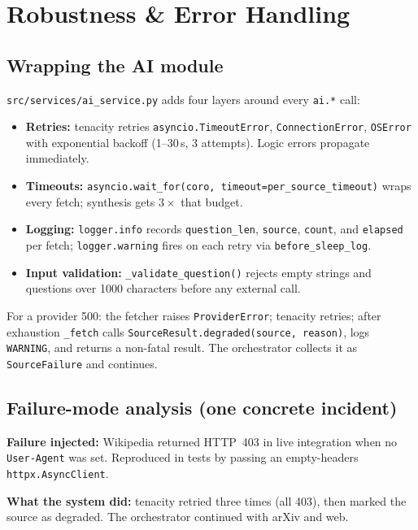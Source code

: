 \documentclass[11pt,a4paper]{article}
\begin{document}
\section{Robustness \& Error Handling}\label{sec:robustness}

\subsection{Wrapping the AI module}

\texttt{src/services/ai\_service.py} adds four layers around every \texttt{ai.*} call:

\begin{itemize}[nosep,leftmargin=1.2em]
  \item \textbf{Retries:} tenacity retries \texttt{asyncio.TimeoutError}, \texttt{ConnectionError}, \texttt{OSError} with exponential backoff (1--30\,s, 3 attempts). Logic errors propagate immediately.
  \item \textbf{Timeouts:} \texttt{asyncio.wait\_for(coro, timeout=per\_source\_timeout)} wraps every fetch; synthesis gets $3\times$ that budget.
  \item \textbf{Logging:} \texttt{logger.info} records \texttt{question\_len}, \texttt{source}, \texttt{count}, and \texttt{elapsed} per fetch; \texttt{logger.warning} fires on each retry via \texttt{before\_sleep\_log}.
  \item \textbf{Input validation:} \texttt{\_validate\_question()} rejects empty strings and questions over 1000 characters before any external call.
\end{itemize}

For a provider 500: the fetcher raises \texttt{ProviderError}; tenacity retries; after exhaustion \texttt{\_fetch} calls \texttt{SourceResult.degraded(source, reason)}, logs \texttt{WARNING}, and returns a non-fatal result. The orchestrator collects it as \texttt{SourceFailure} and continues.

\subsection{Failure-mode analysis (one concrete incident)}

\textbf{Failure injected:} Wikipedia returned HTTP~403 in live integration when no \texttt{User-Agent} was set. Reproduced in tests by passing an empty-headers \texttt{httpx.AsyncClient}.

\textbf{What the system did:} tenacity retried three times (all 403), then marked the source as degraded. The orchestrator continued with arXiv and web.
\end{document}
